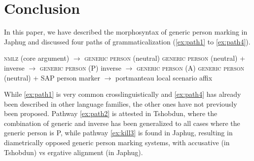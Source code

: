 \section{Conclusion}
In this paper, we have described the morphosyntax of generic person marking in Japhug and discussed four paths of grammaticalization (\ref{ex:path1} to \ref{ex:path4}).


\begin{exe}
\ex \label{ex:path1}
\glt  \textsc{nmlz} (core argument) $\rightarrow$ \textsc{generic person} (neutral)
\ex \label{ex:path2}
\glt  \textsc{generic person} (neutral) + inverse  $\rightarrow$ \textsc{generic person} (P)
\ex \label{ex:path3}
\glt inverse  $\rightarrow$ \textsc{generic person} (A)
\ex \label{ex:path4}
\glt  \textsc{generic person} (neutral) + SAP person marker  $\rightarrow$ portmanteau local scenario affix
\end{exe}

While \ref{ex:path1} is very common crosslinguistically and \ref{ex:path4} has already been described in other language families, the other ones have not previously been proposed. Pathway \ref{ex:path2} is attested in Tshobdun, where the combination of generic and inverse has been generalized to all cases where the generic person is P, while pathway \ref{ex:kill3} is found in Japhug, resulting in diametrically opposed generic person marking systems, with accusative (in Tshobdun) vs ergative alignment (in Japhug).



